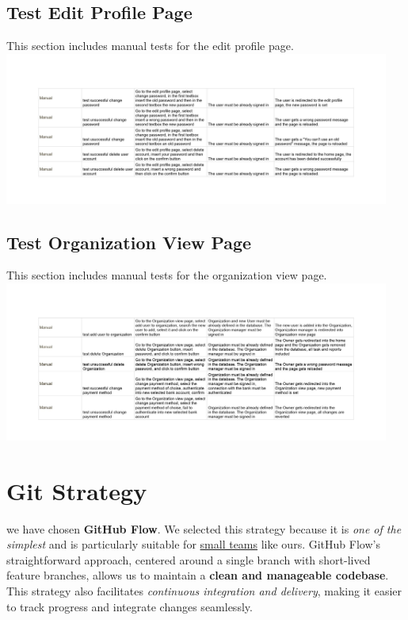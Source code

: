 \documentclass{article}
\begin{document}
\subsection*{Test Edit Profile Page}
This section includes manual tests for the edit profile page.
\newline
\includegraphics[width=0.95\textwidth]{images/Test_EditProfile.jpg}

\subsection*{Test Organization View Page}
This section includes manual tests for the organization view page.
\newline
\includegraphics[width=0.95\textwidth]{images/Test_OrganizationView.jpg}

\section{Git Strategy}

we have chosen \textbf{GitHub Flow}. We selected this strategy because it is \textit{one of the simplest} and is particularly suitable for \underline{small teams} like ours. GitHub Flow's straightforward approach, centered around a single branch with short-lived feature branches, allows us to maintain a \textbf{clean and manageable codebase}. This strategy also facilitates \textit{continuous integration and delivery}, making it easier to track progress and integrate changes seamlessly.
\end{document}
